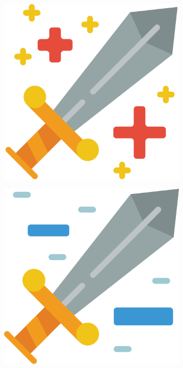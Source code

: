 \begin{figure}[h]
\begin{subfigure}{.1\textwidth}
        \includegraphics[width=.8\linewidth]{images/icons/053-sword.png}
    \end{subfigure}
    \begin{subfigure}{.1\textwidth}
        \centering
        \includegraphics[width=.8\linewidth]{images/icons/054-sword.png}
    \end{subfigure}
    \begin{subfigure}{.1\textwidth}
        \centering

\end{subfigure}
\end{figure}
